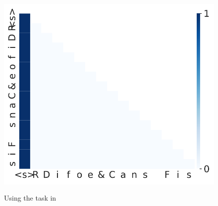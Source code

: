 \begin{figure}[t]
\begin{minipage}{0.3\textwidth}
  \end{minipage}
  \hspace{-1em}
    \begin{minipage}{0.3\textwidth}
      \centering
      \label{fig:appendix-biette-attn-weights-dormant-l1}
      \vspace{-.2em}
      \includegraphics[width=\linewidth]{Figures/figures_pretraining/Biette_attn_weights_seq0_layer1.pdf}
  \end{minipage}
  \vspace{-1em}
  \caption{\small Using the task in \citet{bietti2024birth}}
  \label{figure:appendix-pretraining-biette-findings}
  \vspace{-1em}
\end{figure}

